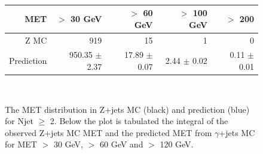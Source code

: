 \begin{figure}[hbt]
  \begin{center}
	\\ \medskip
    \begin{tabular}{r|r|r|r|r}
      MET        & $>$ 30 GeV       & $>$ 60 GeV        & $>$ 100 GeV       & $>$ 200  \\ \hline
	  Z MC       &   919            &    15             &     1             &     0 \\
	  Prediction & 950.35 $\pm$  2.37 &  17.89 $\pm$   0.07 &   2.44 $\pm$   0.02 &   0.11 $\pm$   0.01 \\

    \end{tabular}
	\\ \medskip
    \caption{The MET distribution in Z+jets MC (black) and prediction (blue) for Njet $\ge$ 2. Below the plot is tabulated the integral of the observed Z+jets MC MET and the predicted MET from $\gamma$+jets MC for MET $>$ 30 GeV, $>$ 60 GeV and $>$ 120 GeV. }
    \label{fig:mcclosure}
  \end{center}
\end{figure}




